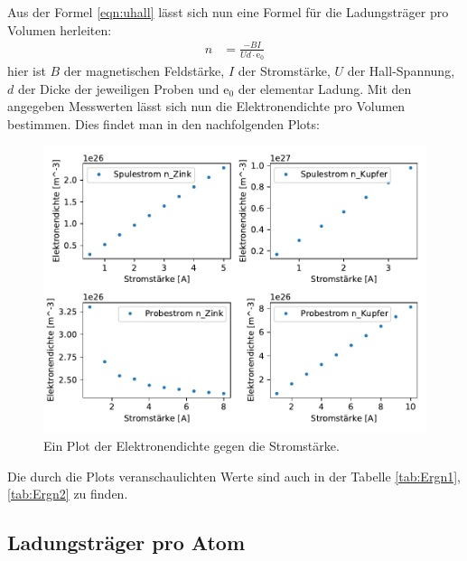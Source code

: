     \noindent
    Aus der Formel \ref{eqn:uhall} lässt sich nun eine Formel für die Ladungsträger pro Volumen herleiten:
    \begin{align}
        n &= \frac{-BI}{Ud\cdot\text{e}_0}
    \end{align}
    hier ist $B$ der magnetischen Feldstärke, $I$ der Stromstärke, $U$ der Hall-Spannung, $d$ der Dicke der jeweiligen Proben und $\text{e}_0$ der 
    elementar Ladung.
    \noindent
    Mit den angegeben Messwerten lässt sich nun die Elektronendichte pro Volumen bestimmen. Dies findet man in den nachfolgenden Plots:
    \begin{figure}[H]
        \centering
        \includegraphics[width=1.1\textwidth]{build/N.pdf}
        \caption{Ein Plot der Elektronendichte gegen die Stromstärke.}
        \label{img:elekdichte}
    \end{figure}
    \noindent
    Die durch die Plots veranschaulichten Werte sind auch in der Tabelle \ref{tab:Ergn1},\ref{tab:Ergn2} zu finden.


    \subsection{Ladungsträger pro Atom}


